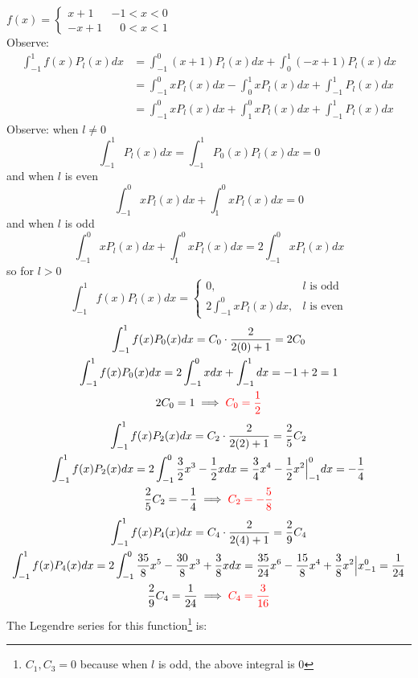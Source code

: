\item [5.] $
\displaystyle f(x)= \begin{cases}
    x+1 & -1< x < 0\\
    -x+1 & \:\:\,\,0< x < 1
\end{cases}$\\[5mm]
Observe:
\begin{align*}
    \int_{-1}^{1}f(x)P_l(x)dx 
    &= \int_{-1}^{0}(x+1)P_l(x)dx + \int_{0}^{1}(-x+1)P_l(x)dx\\ 
    &= \int_{-1}^{0}xP_l(x)dx - \int_{0}^{1}xP_l(x)dx + \int_{-1}^{1}P_l(x)dx \\
    &= \int_{-1}^{0}xP_l(x)dx + \int_{1}^{0}xP_l(x)dx + \int_{-1}^{1}P_l(x)dx 
\end{align*}
Observe: when $l \neq 0$
\[
    \int_{-1}^{1}P_l(x)dx 
    = \int_{-1}^{1}P_0(x)P_l(x)dx = 0
\]
and when $l$ is even
\[
    \int_{-1}^{0}xP_l(x)dx + \int_{1}^{0}xP_l(x)dx = 0
\]
and when $l$ is odd
\[
    \int_{-1}^{0}xP_l(x)dx + \int_{1}^{0}xP_l(x)dx = 
    2\int_{-1}^{0}xP_l(x)dx
\]
so for $l > 0$
\[
    \int_{-1}^1f(x)P_l(x)dx =
    \begin{cases}
        0, & l \text{ is odd}\\
        2 \int_{-1}^0 xP_l(x)dx, & l \text{ is even}
    \end{cases}
\]
\begin{gather*}
    \int_{-1}^{1}f(x)P_0(x)dx =C_0\cdot \frac{2}{2(0)+1} = 2C_0\\
    \int_{-1}^{1}f(x)P_0(x)dx 
    = 2\int_{-1}^{0}xdx + \int_{-1}^{1}dx 
    = -1+2
    = 1\\
    2C_0 = 1 \implies \textcolor{red}{C_0 = \frac{1}{2}}
\end{gather*}
\begin{gather*}
    \int_{-1}^{1}f(x)P_2(x)dx =C_2\cdot \frac{2}{2(2)+1} = \frac{2}{5}C_2\\
    \int_{-1}^{1}f(x)P_2(x)dx
    = 2 \int_{-1}^{0}\frac{3}{2}x^3-\frac{1}{2}xdx
    = \frac{3}{4}x^4-\frac{1}{2}x^2\Big|_{-1}^0dx
    = -\frac{1}{4}\\
    \frac{2}{5}C_2 = -\frac{1}{4} \implies \textcolor{red}{C_2 = -\frac{5}{8}}
\end{gather*}
\begin{gather*}
    \int_{-1}^{1}f(x)P_4(x)dx =C_4\cdot \frac{2}{2(4)+1} = \frac{2}{9}C_4\\
    \int_{-1}^{1}f(x)P_4(x)dx
    = 2 \int_{-1}^{0}\frac{35}{8}x^5 - \frac{30}{8}x^3 + \frac{3}{8}xdx
    = \frac{35}{24}x^6 - \frac{15}{8}x^4 + \frac{3}{8}x^2\Big|x_{-1}^0
    = \frac{1}{24}\\
    \frac{2}{9}C_4 = \frac{1}{24} \implies \textcolor{red}{C_4 = \frac{3}{16}}
\end{gather*}
The Legendre series for this function\footnote{$C_1, C_3 = 0$ because when $l$ is odd, the above integral is 0} is:
